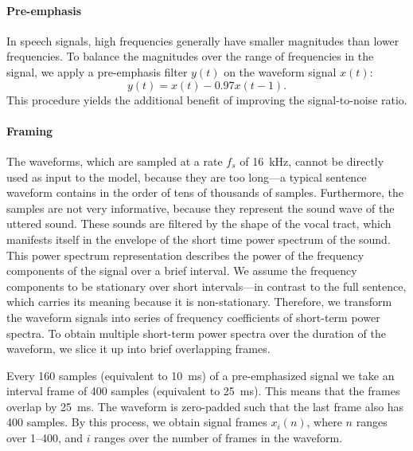 		\paragraph{Pre-emphasis}

			In speech signals, high frequencies generally have smaller magnitudes than lower frequencies.
			To balance the magnitudes over the range of frequencies in the signal, we apply a pre-emphasis filter $y(t)$ on the waveform signal $x(t)$:
			\begin{equation}
				y(t) = x(t) - 0.97x(t-1).
			\end{equation}
			This procedure yields the additional benefit of improving the signal-to-noise ratio.

		\paragraph{Framing}
			The waveforms, which are sampled at a rate $f_s$ of \SI{16}{\kHz}, cannot be directly used as input to the model, because they are too long---a typical sentence waveform contains in the order of tens of thousands of samples.
			Furthermore, the samples are not very informative, because they represent the sound wave of the uttered sound.
			These sounds are filtered by the shape of the vocal tract, which manifests itself in the envelope of the short time power spectrum of the sound.
			This power spectrum representation describes the power of the frequency components of the signal over a brief interval.
			We assume the frequency components to be stationary over short intervals---in contrast to the full sentence, which carries its meaning because it is non-stationary.
			Therefore, we transform the waveform signals into series of frequency coefficients of short-term power spectra.
			To obtain multiple short-term power spectra over the duration of the waveform, we slice it up into brief overlapping frames.


			Every 160 samples (equivalent to \SI{10}{ms}) of a pre-emphasized signal we take an interval frame of 400 samples (equivalent to \SI{25}{ms}).
			This means that the frames overlap by \SI{25}{ms}.
			The waveform is zero-padded such that the last frame also has 400 samples.
			By this process, we obtain signal frames $x_i(n)$, where $n$ ranges over 1--400, and $i$ ranges over the number of frames in the waveform.

